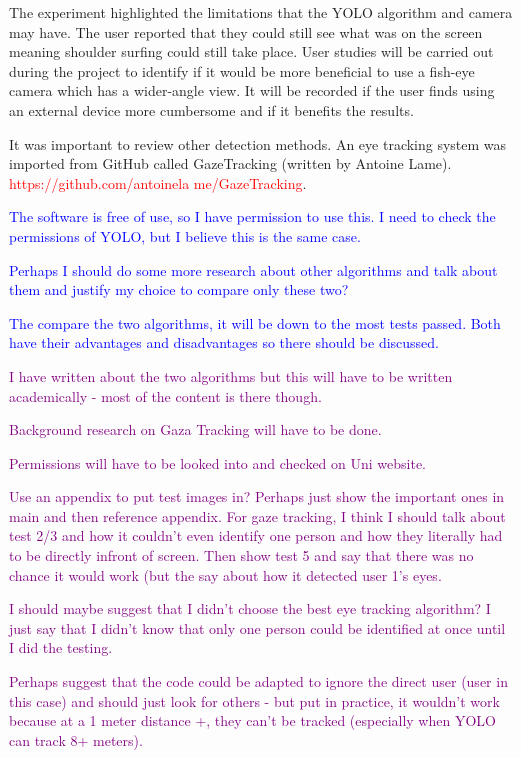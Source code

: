 \documentclass[12pt]{article}
\theoremstyle{plain}
\theoremstyle{definition}
\begin{document}
The experiment highlighted the limitations that the YOLO algorithm and camera may have. The user reported that they could still see what was on the screen meaning shoulder surfing could still take place. 
User studies will be carried out during the project to identify if it would be more beneficial to use a fish-eye camera which has a wider-angle view. It will be recorded if the user finds using an external device more cumbersome and if it benefits the results.


It was important to review other detection methods. An eye tracking system was imported from GitHub called GazeTracking (written by Antoine Lame). \textcolor{red}{https://github.com/antoinela me/GazeTracking}.


\textcolor{blue}{The software is free of use, so I have permission to use this. I need to check the permissions of YOLO, but I believe this is the same case.}

\textcolor{blue}{Perhaps I should do some more research about other algorithms and talk about them and justify my choice to compare only these two? }

\textcolor{blue}{The compare the two algorithms, it will be down to the most tests passed. Both have their advantages and disadvantages so there should be discussed.}

\textcolor{purple}{I have written about the two algorithms but this will have to be written academically - most of the content is there though.}

\textcolor{purple}{Background research on Gaza Tracking will have to be done.}

\textcolor{purple}{Permissions will have to be looked into and checked on Uni website.}

\textcolor{purple}{Use an appendix to put test images in? Perhaps just show the important ones in main and then reference appendix. For gaze tracking, I think I should talk about test 2/3 and how it couldn't even identify one person and how they literally had to be directly infront of screen. Then show test 5 and say that there was no chance it would work (but the say about how it detected user 1's eyes.}

\textcolor{purple}{I should maybe suggest that I didn't choose the best eye tracking algorithm? I just say that I didn't know that only one person could be identified at once until I did the testing.}

\textcolor{purple}{Perhaps suggest that the code could be adapted to ignore the direct user (user in this case) and should just look for others - but put in practice, it wouldn't work because at a 1 meter distance +, they can't be tracked (especially when YOLO can track 8+ meters).}
\end{document}
